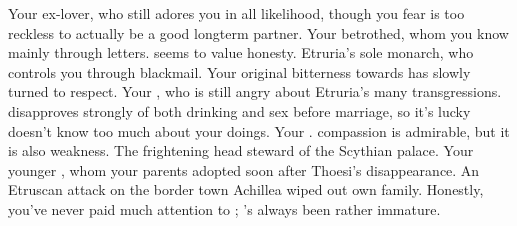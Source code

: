 \documentclass[char]{Kos}
\begin{document}
\begin{contacts}
\contact{\cPoet{}} Your ex-lover, who still adores you in all likelihood, though you fear \cPoet{\they} is too reckless to actually be a good longterm partner.
\contact{\cGroom{}} Your betrothed, whom you know mainly through letters. \cGroom{\They} seems to value honesty.
\contact{\cEtruriaKing{}} Etruria's sole monarch, who controls you through blackmail. Your original bitterness towards \cEtruriaKing{\them} has slowly turned to respect.
\contact{\cScythiaQueen{}} Your \cScythiaQueen{\parent}, who is still angry about Etruria's many transgressions. \cScythiaQueen{} disapproves strongly of both drinking and sex before marriage, so it's lucky \cScythiaQueen{\they} doesn't know too much about your doings.
\contact{\cScythiaKing{}} Your \cScythiaKing{\parent}. \cScythiaKing{\Their} compassion is admirable, but it is also \cScythiaKing{\their} weakness.
\contact{\cButler{}} The frightening head steward of the Scythian palace.
\contact{\cWard{}} Your younger \cWard{\sibling}, whom your parents adopted soon after Thoesi's disappearance. An Etruscan attack on the border town Achillea wiped out \cWard{\their} own family. Honestly, you've never paid much attention to \cWard{\them}; \cWard{\they}'s always been rather immature.
\end{contacts}
\end{document}
